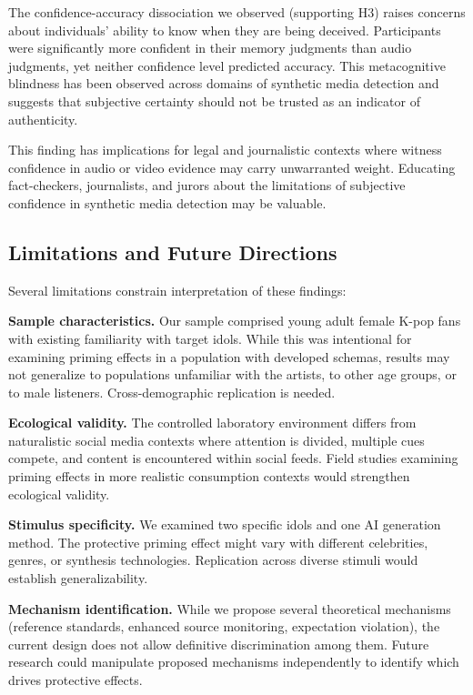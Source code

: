 \documentclass[12pt, a4paper]{article}
\begin{document}
The confidence-accuracy dissociation we observed (supporting H3) raises concerns about individuals' ability to know when they are being deceived. Participants were significantly more confident in their memory judgments than audio judgments, yet neither confidence level predicted accuracy. This metacognitive blindness has been observed across domains of synthetic media detection \citep{nightingale2022ai} and suggests that subjective certainty should not be trusted as an indicator of authenticity.

This finding has implications for legal and journalistic contexts where witness confidence in audio or video evidence may carry unwarranted weight. Educating fact-checkers, journalists, and jurors about the limitations of subjective confidence in synthetic media detection may be valuable.

\subsection{Limitations and Future Directions}

Several limitations constrain interpretation of these findings:

\textbf{Sample characteristics.} Our sample comprised young adult female K-pop fans with existing familiarity with target idols. While this was intentional for examining priming effects in a population with developed schemas, results may not generalize to populations unfamiliar with the artists, to other age groups, or to male listeners. Cross-demographic replication is needed.

\textbf{Ecological validity.} The controlled laboratory environment differs from naturalistic social media contexts where attention is divided, multiple cues compete, and content is encountered within social feeds. Field studies examining priming effects in more realistic consumption contexts would strengthen ecological validity.

\textbf{Stimulus specificity.} We examined two specific idols and one AI generation method. The protective priming effect might vary with different celebrities, genres, or synthesis technologies. Replication across diverse stimuli would establish generalizability.

\textbf{Mechanism identification.} While we propose several theoretical mechanisms (reference standards, enhanced source monitoring, expectation violation), the current design does not allow definitive discrimination among them. Future research could manipulate proposed mechanisms independently to identify which drives protective effects.
\end{document}
